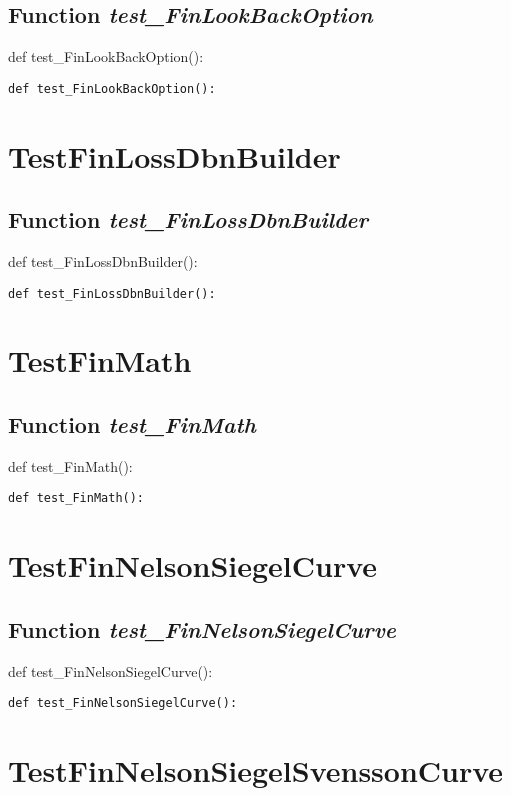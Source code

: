 \documentclass[twoside,11pt]{book}
\begin{document}
\subsection{Function {\it test\_FinLookBackOption}}
def test\_FinLookBackOption():

\begin{lstlisting}
def test_FinLookBackOption():
\end{lstlisting}


\newpage
\section{TestFinLossDbnBuilder}

\subsection{Function {\it test\_FinLossDbnBuilder}}
def test\_FinLossDbnBuilder():

\begin{lstlisting}
def test_FinLossDbnBuilder():
\end{lstlisting}


\newpage
\section{TestFinMath}

\subsection{Function {\it test\_FinMath}}
def test\_FinMath():

\begin{lstlisting}
def test_FinMath():
\end{lstlisting}


\newpage
\section{TestFinNelsonSiegelCurve}

\subsection{Function {\it test\_FinNelsonSiegelCurve}}
def test\_FinNelsonSiegelCurve():

\begin{lstlisting}
def test_FinNelsonSiegelCurve():
\end{lstlisting}


\newpage
\section{TestFinNelsonSiegelSvenssonCurve}
\end{document}
